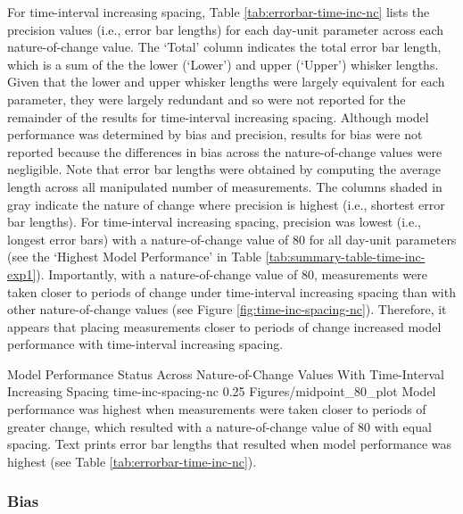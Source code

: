 \documentclass[
12pt, %
twoside,
english]{guelphthesis}
\begin{document}
For time-interval increasing spacing, Table \ref{tab:errorbar-time-inc-nc} lists the precision values (i.e., error bar lengths) for each day-unit parameter across each nature-of-change value. The `Total' column indicates the total error bar length, which is a sum of the the lower (`Lower') and upper (`Upper') whisker lengths. Given that the lower and upper whisker lengths were largely equivalent for each parameter, they were largely redundant and so were not reported for the remainder of the results for time-interval increasing spacing. Although model performance was determined by bias and precision, results for bias were not reported because the differences in bias across the nature-of-change values were negligible. Note that error bar lengths were obtained by computing the average length across all manipulated number of measurements. The columns shaded in gray indicate the nature of change where precision is highest (i.e., shortest error bar lengths). For time-interval increasing spacing, precision was lowest (i.e., longest error bars) with a nature-of-change value of 80 for all day-unit parameters (see the `Highest Model Performance' in Table \ref{tab:summary-table-time-inc-exp1}). Importantly, with a nature-of-change value of 80, measurements were taken closer to periods of change under time-interval increasing spacing than with other nature-of-change values (see Figure \ref{fig:time-inc-spacing-nc}). Therefore, it appears that placing measurements closer to periods of change increased model performance with time-interval increasing spacing.
\begin{apaFigure}
[portrait]
[samepage]
[0cm]
{Model Performance Status Across Nature-of-Change Values With Time-Interval Increasing Spacing}
{time-inc-spacing-nc}
{0.25}
{Figures/midpoint_80_plot}
{Model performance was highest when measurements were taken closer to periods of greater change, which resulted with a nature-of-change value of 80 with equal spacing. Text prints error bar lengths that resulted when model performance was highest (see Table \ref{tab:errorbar-time-inc-nc}).}
\end{apaFigure}
\hypertarget{bias-time-inc-exp1}{%
\subsubsection{Bias}\label{bias-time-inc-exp1}}
\end{document}
